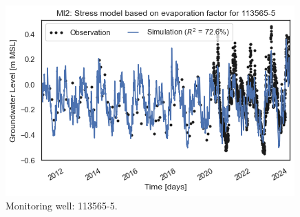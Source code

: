 \begin{figure}[htbp]
\begin{minipage}{0.32\textwidth}
        \includegraphics[width=\linewidth]{frontmatter/Rozenburg-fig/1135655.png}
        \caption{Monitoring well: 113565-5.}
        \label{fig:113565-5}
    \end{minipage}
\end{figure}
